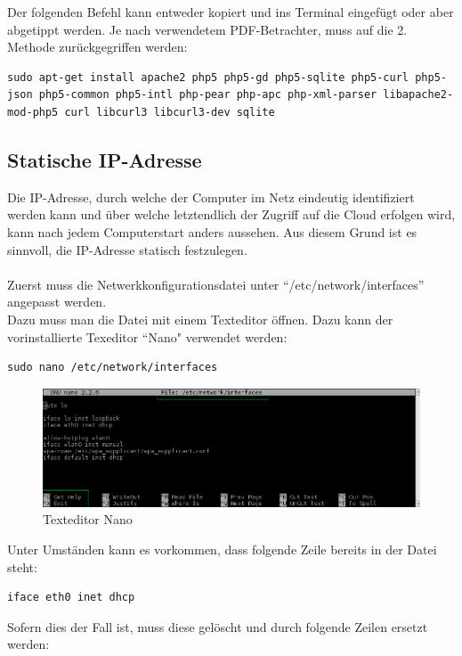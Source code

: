 Der folgenden Befehl kann entweder kopiert und ins Terminal eingefügt oder aber abgetippt werden. Je nach verwendetem PDF-Betrachter, muss auf die 2. Methode zurückgegriffen werden:

\begin{lstlisting}
sudo apt-get install apache2 php5 php5-gd php5-sqlite php5-curl php5-json php5-common php5-intl php-pear php-apc php-xml-parser libapache2-mod-php5 curl libcurl3 libcurl3-dev sqlite
\end{lstlisting}

\subsection{Statische IP-Adresse}
Die IP-Adresse, durch welche der Computer im Netz eindeutig identifiziert werden kann und über welche letztendlich der Zugriff auf die Cloud erfolgen wird, kann nach jedem Computerstart anders aussehen.
Aus diesem Grund ist es sinnvoll, die IP-Adresse statisch festzulegen.
\\
\\
Zuerst muss die Netwerkkonfigurationsdatei unter ``/etc/network/interfaces'' angepasst werden.
\\
Dazu muss man die Datei mit einem Texteditor öffnen. Dazu kann der vorinstallierte Texeditor ``Nano" verwendet werden: 

\begin{lstlisting}
sudo nano /etc/network/interfaces
\end{lstlisting} 

\begin{figure}[h]
\centering
\includegraphics[scale=0.6]{images/nano}
\caption{Texteditor Nano}
\end{figure}

Unter Umständen kann es vorkommen, dass folgende Zeile bereits in der Datei steht:

\begin{lstlisting}
iface eth0 inet dhcp
\end{lstlisting}

Sofern dies der Fall ist, muss diese gelöscht und durch folgende Zeilen ersetzt werden:

